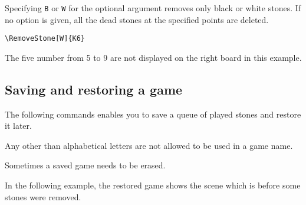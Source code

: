 \documentclass[a4paper]{oblivoir}
\begin{document}
Specifying \texttt{B} or \texttt{W} for the optional argument removes only black or white stones.
If no option is given, all the dead stones at the specified points are deleted.
\begin{verbatim}
\RemoveStone[W]{K6}
\end{verbatim}

\ClearHistory

\noindent
\begin{boxedverbatim}
\begin{ksbadukpan}[badukpansize=6][U]
\end{ksbadukpan}
\hfill
\begin{ksbadukpan}[badukpansize=6][U]
\KSBadukContinue
\end{ksbadukpan}
\end{boxedverbatim}

\begin{ksbadukpan}[badukpansize=6][U]
\end{ksbadukpan}
\hfill
\begin{ksbadukpan}[badukpansize=6][U]
\KSBadukContinue
\end{ksbadukpan}

The five number from 5 to 9 are not displayed on the right board in this example.

\subsection{%
Saving and restoring a game}

The following commands enables you to save a queue of played stones and restore it later.

\begin{boxedverbatim}
\end{boxedverbatim}

Any other than alphabetical letters are not allowed to be used in a game name.

\begin{boxedverbatim}
\end{boxedverbatim}

Sometimes a saved game needs to be erased.

In the following example,  the restored game shows the scene which is before some stones were removed.
\end{document}
